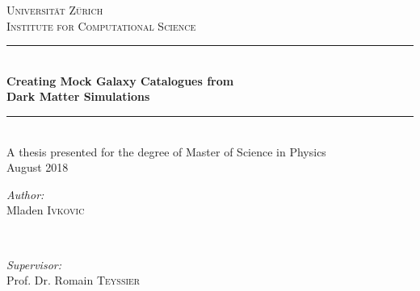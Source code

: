 \begin{titlepage}
    
    \newcommand{\HRule}{\rule{\linewidth}{0.5mm}} %
    
    \center %
    
    
    \textsc{\LARGE Universität Zürich}\\[1.5cm] %
    \textsc{\Large Institute for Computational Science}\\[1.5cm] %
    
    
    \HRule \\[0.4cm]
    { \huge \bfseries 
        Creating Mock Galaxy Catalogues from \\[.2em]
        Dark Matter Simulations}\\[0.4cm] %
    \HRule \\[1.5cm]
    
    
    {\centering A thesis presented for the degree of Master of Science in Physics}\\
    {\large August 2018}\\[2cm] %
    
    
    \begin{minipage}{0.4\textwidth}
        \begin{flushleft} \large
            \emph{Author:}\\
            Mladen \textsc{Ivkovic} %
        \end{flushleft}
    \end{minipage}
    ~
    \begin{minipage}{0.4\textwidth}
        \begin{flushright} \large
            \emph{Supervisor:} \\
            Prof. Dr. Romain \textsc{Teyssier} %
        \end{flushright}
    \end{minipage}\\
    \vfill
    

\end{titlepage}
